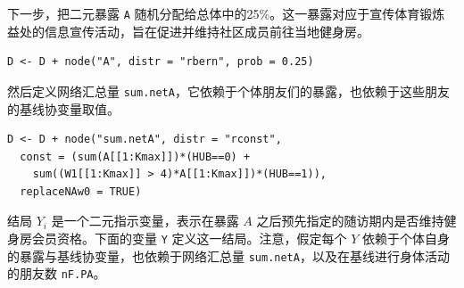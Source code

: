 下一步，把二元暴露 \texttt{A} 随机分配给总体中的25\%。这一暴露对应于宣传体育锻炼益处的信息宣传活动，旨在促进并维持社区成员前往当地健身房。
\par\noindent\begin{minipage}{\linewidth}
\begin{lstlisting}[numbers=none,frame=none]
D <- D + node("A", distr = "rbern", prob = 0.25)
\end{lstlisting}
\end{minipage}\par
然后定义网络汇总量 \texttt{sum.netA}，它依赖于个体朋友们的暴露，也依赖于这些朋友的基线协变量取值。
\par\noindent\begin{minipage}{\linewidth}
\begin{lstlisting}[numbers=none,frame=none]
D <- D + node("sum.netA", distr = "rconst",
  const = (sum(A[[1:Kmax]])*(HUB==0) +
    sum((W1[[1:Kmax]] > 4)*A[[1:Kmax]])*(HUB==1)),
  replaceNAw0 = TRUE)
\end{lstlisting}
\end{minipage}\par
结局 $Y_i$ 是一个二元指示变量，表示在暴露 $A$ 之后预先指定的随访期内是否维持健身房会员资格。下面的变量 \texttt{Y} 定义这一结局。注意，假定每个 $Y$ 依赖于个体自身的暴露与基线协变量，也依赖于网络汇总量 \texttt{sum.netA}，以及在基线进行身体活动的朋友数 \texttt{nF.PA}。

